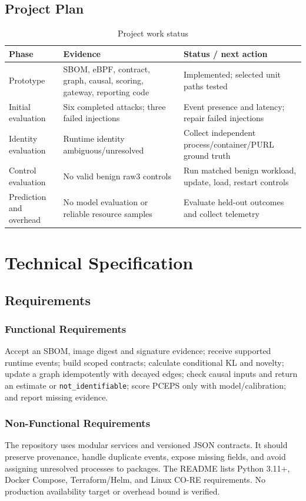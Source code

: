 \documentclass[12pt,a4paper,oneside]{report}
\begin{document}
\section{Project Plan}
\begin{table}[htbp]\centering\caption{Project work status}\label{tab:plan}\begin{tabularx}{\textwidth}{p{1.1in}X X}\toprule Phase&Evidence&Status / next action\\\midrule Prototype&SBOM, eBPF, contract, graph, causal, scoring, gateway, reporting code&Implemented; selected unit paths tested\\Initial evaluation&Six completed attacks; three failed injections&Event presence and latency; repair failed injections\\Identity evaluation&Runtime identity ambiguous/unresolved&Collect independent process/container/PURL ground truth\\Control evaluation&No valid benign raw3 controls&Run matched benign workload, update, load, restart controls\\Prediction and overhead&No model evaluation or reliable resource samples&Evaluate held-out outcomes and collect telemetry\\\bottomrule\end{tabularx}\end{table}

\chapter{Technical Specification}
\section{Requirements}
\subsection{Functional Requirements}
Accept an SBOM, image digest and signature evidence; receive supported runtime events; build scoped contracts; calculate conditional KL and novelty; update a graph idempotently with decayed edges; check causal inputs and return an estimate or \texttt{not\_identifiable}; score PCEPS only with model/calibration; and report missing evidence.
\subsection{Non-Functional Requirements}
The repository uses modular services and versioned JSON contracts. It should preserve provenance, handle duplicate events, expose missing fields, and avoid assigning unresolved processes to packages. The README lists Python 3.11+, Docker Compose, Terraform/Helm, and Linux CO-RE requirements. No production availability target or overhead bound is verified.
\end{document}
